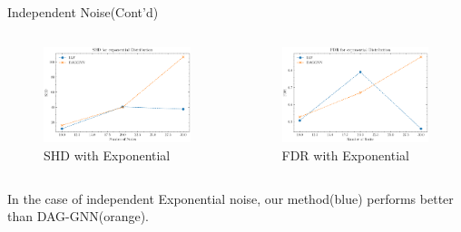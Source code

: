 \documentclass{beamer}
\begin{document}
\begin{frame}{Independent Noise(Cont'd)}
    \begin{columns}
        \begin{column}{0.5\textwidth}
            \begin{figure}
                \centering
                \includegraphics[width=\textwidth]{fig/SHD_independence_exponential.pdf}
                \caption{SHD with Exponential}
                \label{fig:ind_exponential_shd}
            \end{figure}
        \end{column}
        \begin{column}{0.5\textwidth}
            \begin{figure}
                \centering
                \includegraphics[width=\textwidth]{fig/FDR_independence_exponential.pdf}
                \caption{FDR with Exponential}
                \label{fig:ind_exponential_fdr}
            \end{figure}
        \end{column}
    \end{columns}
    In the case of independent Exponential noise, our method(blue) performs better than DAG-GNN(orange).
\end{frame}
\end{document}
